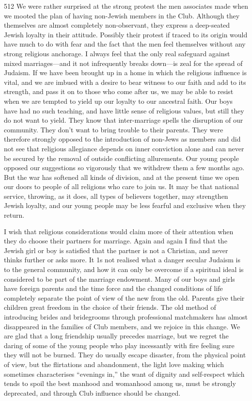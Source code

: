 \begin{tp}{512}
We were rather surprised at the strong protest the men
associates made when we mooted the plan of having
non-Jewish members in the Club. Although they themselves
are almost completely non-observant, they express a deep-seated
Jewish loyalty in their attitude. Possibly their
protest if traced to its origin would have much to do with
fear and the fact that the men feel themselves without
any strong religious anchorage. I always feel that the
only real safeguard against mixed marriages—and it not
infrequently breaks down—is zeal for the spread of
Judaism. If we have been brought up in a home in which the
religious influence is vital, and we are imbued with a
desire to bear witness to our faith and add to its strength,
and pass it on to those who come after us, we may be
able to resist when we are tempted to yield up our loyalty
to our ancestral faith. Our boys have had no such teaching,
and have little sense of religious values, but still they
do not want to yield. They know that inter-marriage
spells the disruption of our community. They don’t want
to bring trouble to their parents. They were therefore
strongly opposed to the introduction of non-Jews as
members and did not see that religious allegiance depends on
inner conviction alone and can never be secured by the
removal of outside conflicting allurements. Our young
people opposed our suggestions so vigorously that we
withdrew them a few months ago. But the war has
softened all kinds of division, and at the present time we
open our doors to people of all religions who care to join
us. It may be that national service, throwing, as it does,
all types of believers together, may strengthen Jewish
loyalty, and our young people may be less fearful and
exclusive when they return.
\end{tp}

I wish that religious considerations would claim more
of their attention when they do choose their partners for
marriage. Again and again I find that the Jewish girl
or boy is satisfied that the partner is not a Christian, and
never thinks further or asks more. It 1s not realised what
a danger secular Judaism is to the general community,
and how it can only be overcome if a spiritual ideal is
considered to be part of the marriage endowment. Many
of our boys and girls have foreign parents and the time
force and the changed conditions of life completely
separate the point of view of the new from the old.
Parents give their children great freedom in the choice
of their friends. The old method of introducing brides
and bridegrooms through professional matchmakers has
almost disappeared in the families of Club members, and
we rejoice in this change. We are glad that a long friendship
usually precedes marriage, but we regret the daring
of some of the young people who play incessantly with
fire feeling sure they will not be burned. They do usually
escape disaster, from the physical point of view, but the
flirtations and abandonment, the light love making which
sometimes characterises “evenings in,” the want of
dignity and self-respect which tends to spoil the best manhood
and womanhood among us, must be strongly deprecated,
and through Club influence should be changed.

